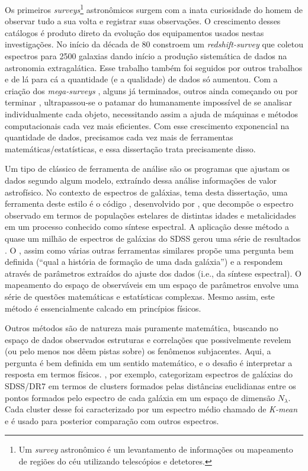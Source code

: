 Os primeiros {\em surveys}\footnote{Um {\em survey} astronômico é um levantamento de informações ou mapeamento de
regiões do céu utilizando telescópios e detetores.} astronômicos surgem com a inata curiosidade do homem de observar
tudo a sua volta e registrar suas observações. O crescimento desses catálogos é produto direto da evolução dos
equipamentos usados nestas investigações. No início da década de 80 \citet{Huchra1983} constroem um {\em
redshift-survey} que coletou espectros para 2500 galaxias dando início a produção sistemática de dados na astronomia
extragalática. Esse trabalho também foi seguidos por outros trabalhos \citep[e.g., ][]{Huchra1988, DaCosta1988} e de lá
para cá a quantidade (e a qualidade) de dados só aumentou. Com a criação dos {\em mega-surveys} \citep[\SDSS, 2dFGRS,
2MASS; ][]{York2000, Colless1999, Skrutskie2006}, alguns já terminados, outros ainda começando ou por terminar
\citep[LSST, JPAS; ][]{Ivezic2008, Benitez2009}, ultrapassou-se o patamar do humanamente impossível de
se analisar individualmente cada objeto, necessitando assim a ajuda de máquinas e métodos computacionais cada vez mais
eficientes. Com esse crescimento exponencial na quantidade de dados, precisamos cada vez mais de ferramentas
matemáticas/estatísticas, e essa dissertação trata precisamente disso.

Um tipo de clássico de ferramenta de análise são os programas que ajustam os dados segundo algum modelo, extraíndo dessa
análise informações de valor astrofísico. No contexto de espectros de galáxias, tema desta dissertação, uma ferramenta
deste estilo é o código \starlight, desenvolvido por \citet{CidFernandes2005}, que decompõe o espectro observado em
termos de populações estelares de distintas idades e metalicidades em um processo conhecido como síntese espectral.
A aplicação desse método a quase um milhão de espectros de galáxias do SDSS gerou uma série de resultados \citep[e.g.,
][]{Asari2007, Asari2009, CidFernandes2007, Mateus2007}. O \starlight, assim como várias outras ferramentas similares
\citep{Panter2003, Gallazzi2005, Ocvirk2006} propõe uma pergunta bem definida (``qual a história de formação de
uma dada galáxia'') e a respondem através de parâmetros extraídos do ajuste dos dados (i.e., da síntese espectral). O
mapeamento do espaço de observáveis em um espaço de parâmetros envolve uma série de questões matemáticas e estatísticas
complexas. Mesmo assim, este método é essencialmente calcado em princípios físicos.

Outros métodos são de natureza mais puramente matemática, buscando no espaço de dados observados estruturas e
correlações que possivelmente revelem (ou pelo menos nos dêem pistas sobre) os fenômenos subjacentes. Aqui, a pergunta é
bem definida em um sentido matemático, e o desafio é interpretar a resposta em termos físicos.
\citet{SanchezAlmeida2010}, por exemplo, categorizam espectros de galáxias do SDSS/DR7 em termos de clusters formados
pelas distâncias euclidianas entre os pontos formados pelo espectro de cada galáxia em um espaço de dimensão
$N_\lambda$. Cada cluster desse foi caracterizado por um espectro médio chamado de {\em K-mean} e é usado para posterior
comparação com outros espectros. 

